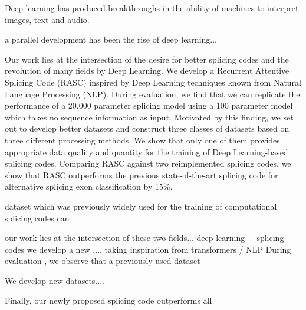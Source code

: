 

Deep learning has produced breakthroughs in the ability of machines to interpret images, text and audio. 


a parallel development has been the rise of deep learning... \cite{deeplearning}



Our work lies at the intersection of the desire for better splicing codes and the revolution of many fields by Deep Learning. We develop a Recurrent Attentive Splicing Code (RASC) inspired by Deep Learning techniques known from Natural Language Processing (NLP). During evaluation, we find that we can replicate the performance of a 20,000 parameter splicing model using a 100 parameter model which takes no sequence information as input. Motivated by this finding, we set out to develop better datasets and construct three classes of datasets based on three different processing methods. We show that only one of them provides appropriate data quality and quantity for the training of Deep Learning-based splicing codes. Comparing RASC against two reimplemented splicing codes, we show that RASC outperforms the previous state-of-the-art splicing code for alternative splicing exon classification by 15\%. 

 dataset which was previously widely used for the training of computational splicing codes can 

our work lies at the intersection of these two fields... deep learning + splicing codes
	we develop a new .... taking inspiration from transformers / NLP
	During evaluation , we observe that a previously used dataset 

We develop new datasets....

Finally, our newly proposed splicing code outperforms all 






%
%
%
%
%





